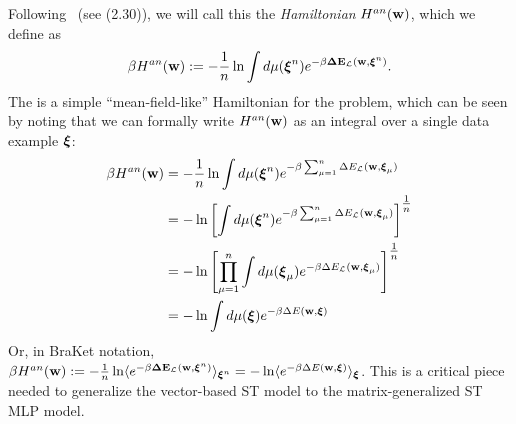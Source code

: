 {Following~\cite{SST92} (see \EQN(2.30)), we will call this the \emph{\Annealed Hamiltonian} $H^{an}({\mathbf{w}})$, 
which we define as  %
  \begin{align}
   \label{eqn:Gan_def}
   \beta H^{an}({\mathbf{w}}):= - \frac{1}{n}\ln  \int d\mu(\boldsymbol{\xi}^{n})e^{-\beta\mathbf{\Delta {E}}_{\mathcal{L}}(\mathbf{w}, \boldsymbol{\xi}^{n})}.
  \end{align}
  The \AnnealedHamiltonian is a simple ``mean-field-like'' Hamiltonian for the problem, which
  can be seen by noting that we can formally write $H^{an}({\mathbf{w}})$ as an integral over a single data example $\boldsymbol{\xi}$:
 \begin{align}
   \label{eqn:Gan_simplified}
   \beta H^{an}({\mathbf{w}}) &=  - \frac{1}{n}\ln  \int d\mu(\boldsymbol{\xi}^{n})e^{-\beta\sum_{\mu=1}^{n}\Delta E_{\mathcal{L}}({\mathbf{w}},\boldsymbol{\xi}_{\mu})} \\ \nonumber
   &=  - \ln \left[\int d\mu(\boldsymbol{\xi}^{n})e^{-\beta\sum_{\mu=1}^{n}\Delta E_{\mathcal{L}}({\mathbf{w}},\boldsymbol{\xi}_{\mu})}\right]^{\tfrac{1}{n}} \\ \nonumber
   &=  - \ln \left[\prod_{\mu=1}^{n}\int d\mu(\boldsymbol{\xi}_{\mu})e^{-\beta\Delta E_{\mathcal{L}}({\mathbf{w}},\boldsymbol{\xi}_{\mu})}\right]^{\tfrac{1}{n}} \\ \nonumber
   &=  - \ln  \int d\mu(\boldsymbol{\xi})e^{-\beta\Delta E({\mathbf{w}},\boldsymbol{\xi})}
 \end{align}
 Or, in BraKet notation,
 $\beta H^{an}({\mathbf{w}}):=  -\tfrac{1}{n}\ln\langle e^{-\beta\mathbf{\Delta {E}}_{\mathcal{L}}(\mathbf{w}, \boldsymbol{\xi}^{n})}\rangle_{\boldsymbol{\xi}^{n}}=  -\ln \langle e^{-\beta\Delta E({\mathbf{w}},\boldsymbol{\xi})}\rangle_{\boldsymbol{\xi}}$.
This is a critical piece needed to generalize the vector-based ST \Perceptron model to the matrix-generalized ST MLP model.

}
